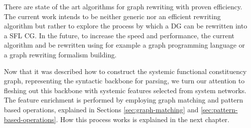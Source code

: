    There are state of the art algorithms for graph rewriting with proven efficiency. The current work intends to be neither generic nor an efficient rewriting algorithm but rather to explore the process by which a DG can be rewritten into a SFL CG. In the future, to increase the speed and performance, the current algorithm and be rewritten using for example a graph programming language or a graph rewriting formalism building. 

    Now that it was described how to construct the systemic functional constituency graph, representing the syntactic backbone for parsing, we turn our attention to fleshing out this backbone with systemic features selected from system networks. The feature enrichment is performed by employing graph matching and pattern based operations, explained in Sections \ref{sec:graph-matching} and \ref{sec:pattern-based-operations}. How this process works is explained in the next chapter.
    


